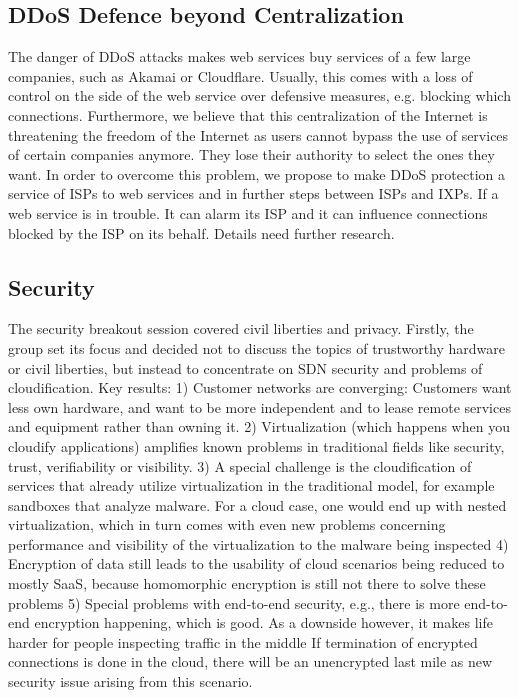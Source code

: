 \subsection{DDoS Defence beyond Centralization}

The danger of \ac{DDoS} attacks makes web services buy services of a few large
companies, such as Akamai or Cloudflare. Usually, this comes with a loss of
control on the side of the web service over defensive measures, e.g. blocking
which connections. Furthermore, we believe that this centralization of the
Internet is threatening the freedom of the Internet as users cannot bypass the
use of services of certain companies anymore. They lose their authority to
select the ones they want. In order to overcome this problem, we propose to
make \ac{DDoS} protection a service of ISPs to web services and in further
steps between ISPs and IXPs. If a web service is in trouble. It can alarm its
ISP and it can influence connections blocked by the ISP on its behalf. Details
need further research.

\subsection{Security}

The security breakout session covered civil liberties and privacy. Firstly,
the group set its focus and decided not to discuss the topics of trustworthy
hardware or civil liberties, but instead to concentrate on \ac{SDN} security
and problems of cloudification. Key results: 1) Customer networks are
converging:  Customers want less own hardware, and want to be more independent
and to lease remote services and equipment rather than owning it.  2)
Virtualization (which happens when you cloudify applications) amplifies known
problems in traditional fields like security, trust, verifiability or
visibility.  3) A special challenge is the cloudification of services that
already utilize virtualization in the traditional model, for example sandboxes
that analyze malware.  For a cloud case, one would end up with nested
virtualization, which in turn comes with even new problems concerning
performance and visibility of the virtualization to the malware being
inspected 4) Encryption of data still leads to the usability of cloud
scenarios being reduced to mostly SaaS, because homomorphic encryption is
still not there to solve these problems 5) Special problems with end-to-end
security, e.g., there is more end-to-end encryption happening, which is good.
As a downside however, it makes life harder for people inspecting traffic in
the middle If termination of encrypted connections is done in the cloud, there
will be an unencrypted last mile as new security issue arising from this
scenario.

